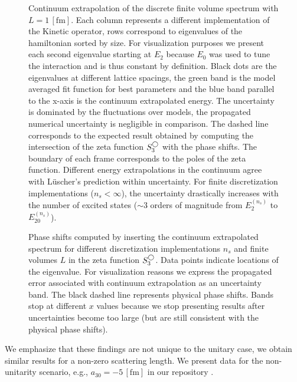 \begin{figure}[htb]
\scalebox{1.0}{}
\caption{
    \label{fig:continuum-extrapolation-spectrum}
    Continuum extrapolation of the discrete finite volume spectrum with $L=1\,[\mathrm{fm}]$.
    Each column represents a different implementation of the Kinetic operator, rows correspond to eigenvalues of the hamiltonian sorted by size.
    For visualization purposes we present each second eigenvalue starting at $E_2$ because $E_0$ was used to tune the interaction and is thus constant by definition.
    Black dots are the eigenvalues at different lattice spacings, the green band is the model averaged fit function for best parameters and the blue band parallel to the x-axis is the continuum extrapolated energy.
    The uncertainty is dominated by the fluctuations over models, the propagated numerical uncertainty is negligible in comparison.
    The dashed line corresponds to the expected result obtained by computing the intersection of the zeta function $S^{\bigcirc}_3$ with the phase shifts.
    The boundary of each frame corresponds to the poles of the zeta function.
    Different energy extrapolations in the continuum agree with Lüscher's prediction within uncertainty.
    For finite discretization implementations ($n_s < \infty$), the uncertainty drastically increases with the number of excited states ($\sim 3$ orders of magnitude from $E_2^{(n_s)}$ to $E_{20}^{(n_s)}$).
}
\end{figure}


\begin{figure}[hbt]
    \scalebox{1.0}{}
    \caption{
        \label{fig:continuum-extrapolation-ere}
        Phase shifts computed by inserting the continuum extrapolated spectrum for different discretization implementations $n_s$ and finite volumes $L$ in the zeta function $S^{\bigcirc}_3$.
        Data points indicate locations of the eigenvalue.
        For visualization reasons we express the propagated error associated with continuum extrapolation as an uncertainty band.
        The black dashed line represents physical phase shifts.
        Bands stop at different $x$ values because we stop presenting results after uncertainties become too large (but are still consistent with the physical phase shifts).
        }
\end{figure}


We emphasize that these findings are not unique to the unitary case, we obtain similar results for a non-zero scattering length.
We present data for the non-unitarity scenario, e.g., $a_{30} = - 5 \, [\mathrm{fm}]$ in our repository \cite{repo}.

